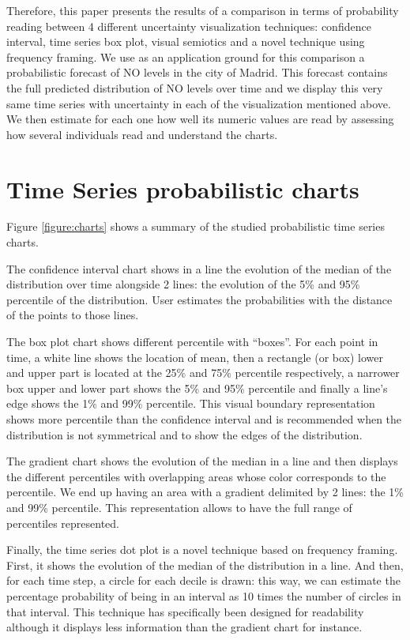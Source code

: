 \documentclass[a4paper,3p,sort&compress]{elsarticle}
\begin{document}
Therefore, this paper presents the results of a comparison in terms of probability reading between 4 different 
uncertainty visualization techniques: confidence interval, time series box plot, visual semiotics and a 
novel technique using frequency framing.
We use as an application ground for this comparison a probabilistic forecast of NO levels 
in the city of Madrid. This forecast contains the full predicted distribution of NO levels over time
and we display this very same time series with uncertainty in each of the visualization mentioned above. 
We then estimate for each one how well its numeric values are read by assessing how several individuals read 
and understand the charts.

\section{Time Series probabilistic charts} 
\label{sec:time_series}

Figure \ref{figure:charts} shows a summary of the studied probabilistic time series charts.

The confidence interval chart shows in a line the evolution of the median of the distribution
 over time alongside 2 lines: the evolution of the 5\% and 95\% percentile of the distribution. 
 User estimates the probabilities with the distance of the points to those lines.

The box plot chart shows different percentile with “boxes”. For each point in time, a white 
line shows the location of mean, then a rectangle (or box) lower and upper part is located 
at the 25\% and 75\% percentile respectively, a narrower box upper and lower part shows 
the 5\% and 95\% percentile and finally a line’s edge shows the 1\% and 99\% percentile. 
This visual boundary representation shows more percentile than the confidence interval and 
is recommended when the distribution is not symmetrical and to show the edges of the distribution.

The gradient chart shows the evolution of the median in a line and then displays the different percentiles
with overlapping areas whose color corresponds to the percentile. We end up having an area with a gradient 
delimited by 2 lines: the 1\% and 99\% percentile. This representation allows to have the
 full range of percentiles represented.

Finally, the time series dot plot is a novel technique based on frequency framing. First, 
it shows the evolution of the median of the distribution in a line. And then, for each time 
step, a circle for each decile is drawn: this way, we can estimate the percentage 
probability of being in an interval as 10 times the number of circles in that interval. 
This technique has 
specifically been designed for readability although it displays less information than 
the gradient chart for instance.
\end{document}

